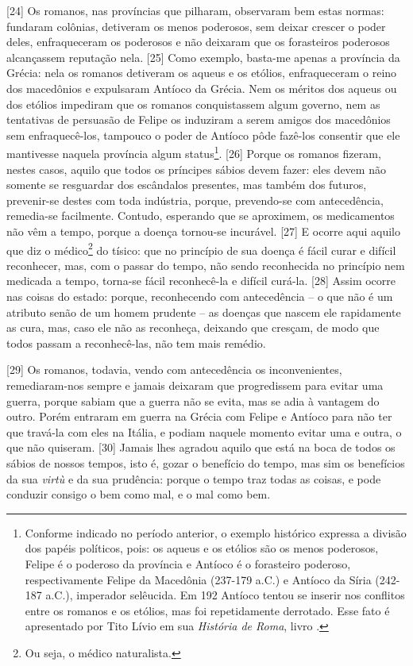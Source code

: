 {[}24{]} Os romanos, nas províncias que pilharam, observaram bem estas
normas: fundaram colônias, detiveram os menos poderosos, sem deixar
crescer o poder deles, enfraqueceram os poderosos e não deixaram que os
forasteiros poderosos alcançassem reputação nela. {[}25{]} Como exemplo,
basta-me apenas a província da Grécia: nela os romanos detiveram os
aqueus e os etólios, enfraqueceram o reino dos macedônios e expulsaram
Antíoco da Grécia. Nem os méritos dos aqueus ou dos etólios impediram
que os romanos conquistassem algum governo, nem as tentativas de
persuasão de Felipe os induziram a serem amigos dos macedônios sem
enfraquecê-los, tampouco o poder de Antíoco pôde fazê-los consentir que
ele mantivesse naquela província algum status\footnote{Conforme indicado
  no período anterior, o exemplo histórico expressa a divisão dos papéis
  políticos, pois: os aqueus e os etólios são os menos poderosos, Felipe
  é o poderoso da província e Antíoco é o forasteiro poderoso,
  respectivamente Felipe  da Macedônia (237-179 a.C.) e Antíoco  da
  Síria (242- 187 a.C.), imperador selêucida. Em 192 Antíoco tentou se
  inserir nos conflitos entre os romanos e os etólios, mas foi
  repetidamente derrotado. Esse fato é apresentado por Tito Lívio em sua
  \emph{História de Roma}, livro .}. {[}26{]} Porque os romanos
fizeram, nestes casos, aquilo que todos os príncipes sábios devem fazer:
eles devem não somente se resguardar dos escândalos presentes, mas
também dos futuros, prevenir-se destes com toda indústria, porque,
prevendo-se com antecedência, remedia-se facilmente. Contudo, esperando
que se aproximem, os medicamentos não vêm a tempo, porque a doença
tornou-se incurável. {[}27{]} E ocorre aqui aquilo que diz o
médico\footnote{Ou seja, o médico naturalista.} do tísico: que no
princípio de sua doença é fácil curar e difícil reconhecer, mas, com o
passar do tempo, não sendo reconhecida no princípio nem medicada a
tempo, torna-se fácil reconhecê-la e difícil curá-la. {[}28{]} Assim
ocorre nas coisas do estado: porque, reconhecendo com antecedência -- o
que não é um atributo senão de um homem prudente -- as doenças que
nascem ele rapidamente as cura, mas, caso ele não as reconheça, deixando
que cresçam, de modo que todos passam a reconhecê-las, não tem mais
remédio.

{[}29{]} Os romanos, todavia, vendo com antecedência os inconvenientes,
remediaram-nos sempre e jamais deixaram que progredissem para evitar uma
guerra, porque sabiam que a guerra não se evita, mas se adia à vantagem
do outro. Porém entraram em guerra na Grécia com Felipe e Antíoco para
não ter que travá-la com eles na Itália, e podiam naquele momento evitar
uma e outra, o que não quiseram. {[}30{]} Jamais lhes agradou aquilo que
está na boca de todos os sábios de nossos tempos, isto é, gozar o
benefício do tempo, mas sim os benefícios da sua \emph{virtù} e da sua
prudência: porque o tempo traz todas as coisas, e pode conduzir consigo
o bem como mal, e o mal como bem.

